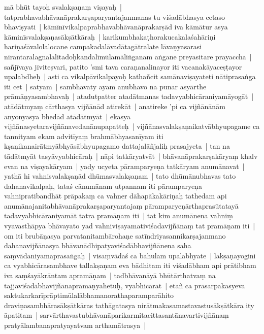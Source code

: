 \documentclass[article,a4paper]{memoir}
\begin{document}
	  \pstart mā\- bhū\-t tayoḥ svalakṣaṇaṃ viṣayaḥ | tatprabhavabhā\-vanā\-prakarṣaparyantajanmanas tu viśadā\-bhasya cetaso bhaviṣyati | kā\-mī\-nī\-vikalpaprabhavabhā\-vanā\-prakarṣā\-d iva kā\-mā\-tur asya kā\-minī\-svalakṣaṇasā\-kṣā\-tkā\-raḥ | karikumbhakaṭhorakucakalaśahā\-riṇi hariṇaśā\-valolalocane campakadalā\-vadā\-tagā\-tralate lā\-vaṇyasarasi nirantaralagnalalitadoḥkandalī\-mū\-lamā\-liṅganam aṅgane preyasitare prayaccha | sañjī\-vaya jī\-viteṣvari, patito 'smi tava caraṇanalinayor iti vacanakā\-yaceṣṭayor upalabdheḥ | asti ca vikalpā\-vikalpayoḥ kathañcit samā\-naviṣayateti nā\-tiprasaṅga iti cet | satyam | sambhavaty ayam anubhavo na punar asyā\-rthe prā\-mā\-ṇyasambhavaḥ | atadutpatter atadā\-tmanas tadavyabhicā\-raniyamā\-yogā\-t | atā\-dā\-tmyaṃ cā\-rthasya vijñā\-nā\-d atirekā\-t | anatireke 'pi ca vijñā\-nā\-nā\-m anyonyasya bhedā\-d atā\-dā\-tmyā\-t | ekasya vijñā\-nasyetaravijñā\-navedanā\-nupapatteḥ | vijñā\-nasvalakṣaṇaikatvā\-bhyupagame ca tannityam ekam advitī\-yaṃ brahmā\-bhyasanī\-yam iti kṣaṇikanairā\-tmyā\-bhyā\-sā\-bhyupagamo dattajalā\-ñjaliḥ prasajyeta | tan na tā\-dā\-tmyā\-t tasyā\-vyabhicā\-raḥ | nā\-pi tatkā\-ryatvā\-t | bhā\-vanā\-prakarṣakā\-ryaṃ khalv evan na viṣayakā\-ryam | yady ucyeta pā\-ramparyeṇa tatkā\-ryam anumā\-navat | yathā\- hi vahnisvalakṣaṇā\-d dhū\-masvalakṣaṇam | tato dhū\-mā\-nubhavas tato dahanavikalpaḥ, tataś cā\-numā\-nam utpannam iti pā\-ramparyeṇa vahnipratibandhā\-t prā\-pakaṃ ca vahner dā\-hapā\-kakā\-riṇaḥ tathedam api anumā\-najanitabhā\-vanā\-prakarṣaparyantajaṃ pā\-ramparyeṇā\-rthaprasū\-tatayā\- tadavyabhicā\-raniyamā\-t tatra pramā\-ṇam iti | tat kim anumā\-nena vahniṃ vyavasthā\-pya bhā\-vayato yad vahniviṣayamativiśadavijñā\-naṃ tat pramā\-ṇam iti | om iti brubā\-ṇasya parvatanitambā\-rohaṇe satī\-ndriyasannikarṣajanmano dahanavijñā\-nasya bhā\-vanā\-dhipatyaviśadā\-bhavijñā\-nena saha saṃvā\-daniyamaprasaṅgaḥ | visaṃvā\-daś ca bahulam upalabhyate | lakṣaṇayogini ca vyabhicā\-rasambhave tallakṣaṇam eva bā\-dhitam iti viśadā\-bham api prā\-tibham iva saṃśayā\-krā\-ntam apramā\-ṇam | tadbhā\-vanā\-yā\- bhū\-tā\-rthatvaṃ na tajjaviśadā\-bhavijñā\-naprā\-mā\-ṇyahetuḥ, vyabhicā\-rā\-t | etañ ca prā\-sarpakasyeva saktukarkarī\-prā\-ptimū\-lalā\-bhamanorathaparamparā\-hito draviṇasambhā\-rasā\-kṣā\-tkā\-ras tathā\-gatasya nirā\-tmakasamastavastusā\-kṣā\-tkā\-ra ity ā\-patitam | sarvā\-rthavastubhā\-vanā\-parikarmitacittasantā\-navartivijñā\-naṃ pratyā\-lambanapratyayatvam arthamā\-trasya | 
	\pend
      
\end{document}
